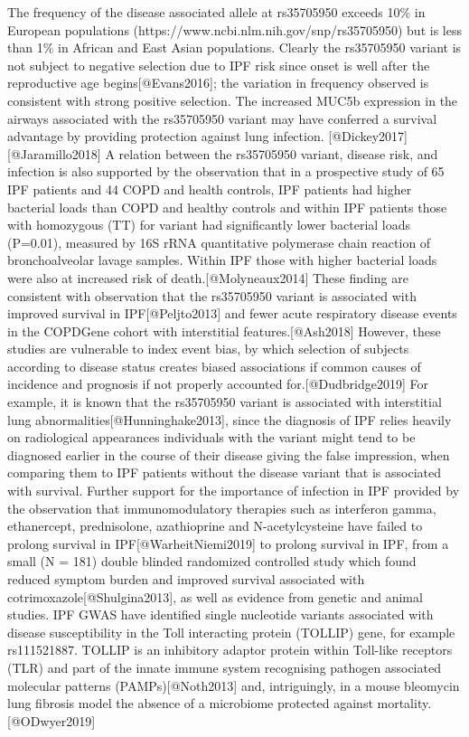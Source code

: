 \documentclass[
]{article}
\begin{document}
The frequency of the disease associated allele at rs35705950 exceeds
10\% in European populations
(https://www.ncbi.nlm.nih.gov/snp/rs35705950) but is less than 1\% in
African and East Asian populations. Clearly the rs35705950 variant is
not subject to negative selection due to IPF risk since onset is well
after the reproductive age begins{[}@Evans2016{]}; the variation in
frequency observed is consistent with strong positive selection. The
increased MUC5b expression in the airways associated with the rs35705950
variant may have conferred a survival advantage by providing protection
against lung infection. {[}@Dickey2017{]}{[}@Jaramillo2018{]} A relation
between the rs35705950 variant, disease risk, and infection is also
supported by the observation that in a prospective study of 65 IPF
patients and 44 COPD and health controls, IPF patients had higher
bacterial loads than COPD and healthy controls and within IPF patients
those with homozygous (TT) for variant had significantly lower bacterial
loads (P=0.01), measured by 16S rRNA quantitative polymerase chain
reaction of bronchoalveolar lavage samples. Within IPF those with higher
bacterial loads were also at increased risk of
death.{[}@Molyneaux2014{]} These finding are consistent with observation
that the rs35705950 variant is associated with improved survival in
IPF{[}@Peljto2013{]} and fewer acute respiratory disease events in the
COPDGene cohort with interstitial features.{[}@Ash2018{]} However, these
studies are vulnerable to index event bias, by which selection of
subjects according to disease status creates biased associations if
common causes of incidence and prognosis if not properly accounted
for.{[}@Dudbridge2019{]} For example, it is known that the rs35705950
variant is associated with interstitial lung
abnormalities{[}@Hunninghake2013{]}, since the diagnosis of IPF relies
heavily on radiological appearances individuals with the variant might
tend to be diagnosed earlier in the course of their disease giving the
false impression, when comparing them to IPF patients without the
disease variant that is associated with survival. Further support for
the importance of infection in IPF provided by the observation that
immunomodulatory therapies such as interferon gamma, ethanercept,
prednisolone, azathioprine and N-acetylcysteine have failed to prolong
survival in IPF{[}@WarheitNiemi2019{]} to prolong survival in IPF, from
a small (N = 181) double blinded randomized controlled study which found
reduced symptom burden and improved survival associated with
cotrimoxazole{[}@Shulgina2013{]}, as well as evidence from genetic and
animal studies. IPF GWAS have identified single nucleotide variants
associated with disease susceptibility in the Toll interacting protein
(TOLLIP) gene, for example rs111521887. TOLLIP is an inhibitory adaptor
protein within Toll-like receptors (TLR) and part of the innate immune
system recognising pathogen associated molecular patterns
(PAMPs){[}@Noth2013{]} and, intriguingly, in a mouse bleomycin lung
fibrosis model the absence of a microbiome protected against
mortality.{[}@ODwyer2019{]}
\end{document}
